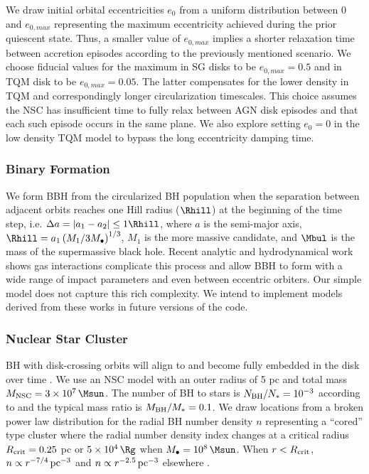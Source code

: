 We draw initial orbital eccentricities $e_0$ from a uniform distribution between 0 and $e_{0,max}$ representing the maximum eccentricity achieved during the prior quiescent state.
Thus, a smaller value of $e_{0,max}$ implies a shorter relaxation time between accretion episodes according to the previously mentioned scenario.
We choose fiducial values for the maximum in SG disks to be $e_{0,max}=0.5$ and in TQM disk to be $e_{0,max}=0.05$.
The latter compensates for the lower density in TQM and correspondingly longer circularization timescales.
This choice assumes the NSC has insufficient time to fully relax between AGN disk episodes and that each such episode occurs in the same plane.
We also explore setting $e_0=0$ in the low density TQM model to bypass the long eccentricity damping time.

\subsubsection{Binary Formation}
We form BBH from the circularized BH population when the separation between adjacent orbits reaches one Hill radius ($\Rhill$) at the beginning of the time step, i.e. $\Delta a = |a_1-a_2| \leq 1\Rhill$, where $a$ is the semi-major axis, $\Rhill = a_1 \left( M_1/3M_{\bullet} \right)^{1/3}$, $M_1$ is the more massive candidate, and $\Mbul$ is the mass of the supermassive black hole.
Recent analytic \citep{QianLiLai24, DodiciTremaine24} and hydrodynamical work \citep{DeLaurentiis+23, Whitehead+24} shows gas interactions complicate this process and allow BBH to form with a wide range of impact parameters and even between eccentric orbiters.
Our simple model does not capture this rich complexity.
We intend to implement models derived from these works in future versions of the code.

\subsubsection{Nuclear Star Cluster}
BH with disk-crossing orbits will align to and become fully embedded in the disk over time \citep{Fabj+20,Nasim+22,McKernan+22-starfall,WangZhuLin24}.
We use an NSC model with an outer radius of 5 pc and total mass $M_{\rm NSC}=3 \times 10^7\,\Msun$.
The number of BH to stars is $N_{\rm BH}/N_{*} = 10^{-3}$ according to \citet{Generozov+18} and the typical mass ratio is $M_{\rm BH}/M_{*} = 0.1$.
We draw locations from a broken power law distribution for the radial BH number density $n$ representing a ``cored'' type cluster where the radial number density index changes at a critical radius $R_{\rm crit}=0.25$ pc or $5\times10^4\,\Rg$ when $M_\bullet=10^8\,\Msun$.
When $r<R_{\rm crit}$, $n\propto r^{-7/4}\,{\rm pc}^{-3}$ and $n\propto r^{-2.5}\,{\rm pc}^{-3}$ elsewhere \citep{BachallWolf76,Generozov+18}.

